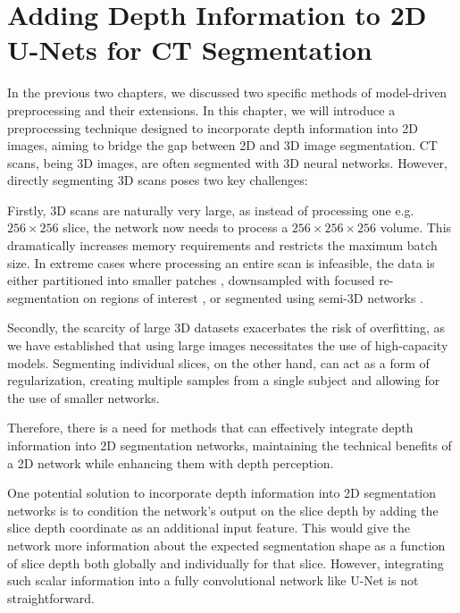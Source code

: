
\chapter{Adding Depth Information to 2D U-Nets for CT Segmentation} %
\label{chap:semi-3d}

In the previous two chapters, we discussed two specific methods of model-driven preprocessing and their extensions. In this chapter, we will introduce a preprocessing technique designed to incorporate depth information into 2D images, aiming to bridge the gap between 2D and 3D image segmentation. CT scans, being 3D images, are often segmented with 3D neural networks. However, directly segmenting 3D scans poses two key challenges:

Firstly, 3D scans are naturally very large, as instead of processing one e.g. $256 \times 256$ slice, the network now needs to process a $256 \times 256 \times 256$ volume. This dramatically increases memory requirements and restricts the maximum batch size. In extreme cases where processing an entire scan is infeasible, the data is either partitioned into smaller patches \cite{zhu3DCoarsetoFineFramework2018}, downsampled with focused re-segmentation on regions of interest \cite{isenseeNnUNetSelfconfiguringMethod2021}, or segmented using semi-3D networks \cite{wenConvolutionalNeuralNetworks2020}.

Secondly, the scarcity of large 3D datasets exacerbates the risk of overfitting, as we have established that using large images necessitates the use of high-capacity models. Segmenting individual slices, on the other hand, can act as a form of regularization, creating multiple samples from a single subject and allowing for the use of smaller networks.

Therefore, there is a need for methods that can effectively integrate depth information into 2D segmentation networks, maintaining the technical benefits of a 2D network while enhancing them with depth perception.

One potential solution to incorporate depth information into 2D segmentation networks is to condition the network's output on the slice depth by adding the slice depth coordinate as an additional input feature. This would give the network more information about the expected segmentation shape as a function of slice depth both globally and individually for that slice. However, integrating such scalar information into a fully convolutional network like U-Net is not straightforward.

